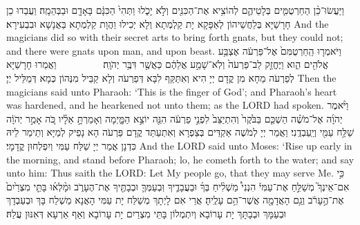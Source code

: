 {%
{וַיַּעֲשׂוּ־כֵ֨ן הַחַרְטֻמִּ֧ים בְּלָטֵיהֶ֛ם לְהוֹצִ֥יא אֶת־הַכִּנִּ֖ים וְלֹ֣א יָכֹ֑לוּ וַתְּהִי֙ הַכִּנָּ֔ם בָּאָדָ֖ם וּבַבְּהֵמָֽה׃
}
{וַעֲבַדוּ כֵן חָרָשַׁיָּא בְּלַחֲשֵׁיהוֹן לְאַפָּקָא יָת קַלְמְתָא וְלָא יְכִילוּ וַהֲוָת קַלְמְתָא בַּאֲנָשָׁא וּבִבְעִירָא׃}
{And the magicians did so with their secret arts to bring forth gnats, but they could not; and there were gnats upon man, and upon beast.}{}
{וַיֹּאמְר֤וּ הַֽחַרְטֻמִּם֙ אֶל־פַּרְעֹ֔ה אֶצְבַּ֥ע אֱלֹהִ֖ים הִ֑וא וַיֶּחֱזַ֤ק לֵב־פַּרְעֹה֙ וְלֹֽא־שָׁמַ֣ע אֲלֵהֶ֔ם כַּאֲשֶׁ֖ר דִּבֶּ֥ר יְהֹוָֽה׃ \setuma         
}
{וַאֲמַרוּ חָרָשַׁיָּא לְפַרְעֹה מַחָא מִן קֳדָם יְיָ הִיא וְאִתַּקַּף לִבָּא דְּפַרְעֹה וְלָא קַבֵּיל מִנְּהוֹן כְּמָא דְּמַלֵּיל יְיָ׃}
{Then the magicians said unto Pharaoh: ‘This is the finger of God’; and Pharaoh’s heart was hardened, and he hearkened not unto them; as the LORD had spoken.}{}
{וַיֹּ֨אמֶר יְהֹוָ֜ה אֶל־מֹשֶׁ֗ה הַשְׁכֵּ֤ם בַּבֹּ֙קֶר֙ וְהִתְיַצֵּב֙ לִפְנֵ֣י פַרְעֹ֔ה הִנֵּ֖ה יוֹצֵ֣א הַמָּ֑יְמָה וְאָמַרְתָּ֣ אֵלָ֗יו כֹּ֚ה אָמַ֣ר יְהֹוָ֔ה שַׁלַּ֥ח עַמִּ֖י וְיַֽעַבְדֻֽנִי׃}
{וַאֲמַר יְיָ לְמֹשֶׁה אַקְדֵּים בְּצַפְרָא וְאִתְעַתַּד קֳדָם פַּרְעֹה הָא נָפֵיק לְמַיָּא וְתֵימַר לֵיהּ כִּדְנָן אֲמַר יְיָ שַׁלַּח עַמִּי וְיִפְלְחוּן קֳדָמָי׃}
{And the LORD said unto Moses: ‘Rise up early in the morning, and stand before Pharaoh; lo, he cometh forth to the water; and say unto him: Thus saith the LORD: Let My people go, that they may serve Me.}{}
{כִּ֣י אִם־אֵינְךָ֮ מְשַׁלֵּ֣חַ אֶת־עַמִּי֒ הִנְנִי֩ מַשְׁלִ֨יחַ בְּךָ֜ וּבַעֲבָדֶ֧יךָ וּֽבְעַמְּךָ֛ וּבְבָתֶּ֖יךָ אֶת־הֶעָרֹ֑ב וּמָ֨לְא֜וּ בָּתֵּ֤י מִצְרַ֙יִם֙ אֶת־הֶ֣עָרֹ֔ב וְגַ֥ם הָאֲדָמָ֖ה אֲשֶׁר־הֵ֥ם עָלֶֽיהָ׃
}
{אֲרֵי אִם לָיְתָךְ מְשַׁלַּח יָת עַמִּי הָאֲנָא מַשְׁלַח בָּךְ וּבְעַבְדָךְ וּבְעַמָּךְ וּבְבָתָּךְ יָת עָרוֹבָא וְיִתְמְלוֹן בָּתֵּי מִצְרַיִם יָת עָרוֹבָא וְאַף אַרְעָא דְּאִנּוּן עֲלַהּ׃}
}

